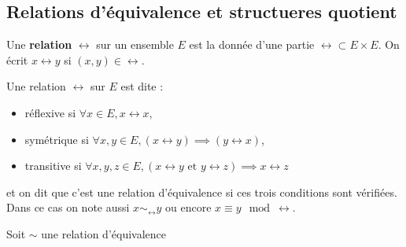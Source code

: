 \subsection{Relations d'équivalence et structueres quotient}

	\begin{defn}
		Une \textbf{relation} $\rel$ sur un ensemble $E$ est la donnée d'une partie $\rel \subset E \times E$.
		On écrit $x \rel y$ si $(x,y) \in \rel$.
	\end{defn}

	\begin{defn}
		Une relation $\rel$ sur $E$ est dite :
		\begin{itemize}
			\item[\textbullet] réflexive si $\forall x \in E, x \rel x$,
			\item[\textbullet] symétrique si $\forall x, y \in E, \left( x \rel y \right) \implies \left( y \rel x \right)$,
			\item[\textbullet] transitive si $\forall x, y, z \in E, \left( x \rel y \text{ et } y \rel z \right) \implies x \rel z$
		\end{itemize}
		et on dit que c'est une relation d'équivalence si ces trois conditions sont vérifiées.
		Dans ce cas on note aussi $x \sim_\rel y$ ou encore $x \equiv y \mod \rel$.
	\end{defn}
	
	\begin{defn}
	Soit $\sim$ une relation d'équivalence 
	\end{defn}
